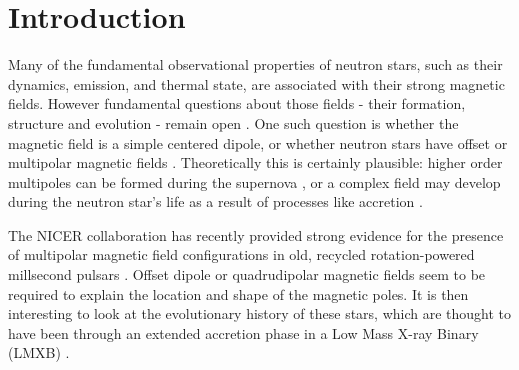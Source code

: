\documentclass[fleqn,usenatbib]{mnras}
\begin{document}
\section{Introduction}

Many of the fundamental observational properties of neutron stars, such as their dynamics, emission, and thermal state, are associated with their strong magnetic fields.  However fundamental questions about those fields - their formation, structure and evolution - remain open \citep[for reviews see][]{Konar2017,Beskin2018,Igoshev2021}.  One such question is whether the magnetic field is a simple centered dipole, or whether neutron stars have offset or multipolar magnetic fields \citep[see e.g.][]{Jones1980,Barnard1982,HardingMuslimov2011fixed,Gralla2017,Sur2020,Petri2021}.  Theoretically this is certainly plausible:  higher order multipoles can be formed during the supernova \citep{Ardeljan2005,Obergaulinger2017}, or a complex field may develop during the neutron star's life as a result of processes like accretion \citep{Suvorov2020}.  

The NICER collaboration has recently provided strong evidence for the presence of multipolar magnetic field configurations in old, recycled rotation-powered millsecond pulsars \citep{Riley2019, Riley2021, Bilous2019, Miller2019, Miller2021}.   Offset dipole or quadrudipolar magnetic fields seem to be required to explain the location and shape of the magnetic poles.  It is then interesting to look at the evolutionary history of these stars, which are thought to have been through an extended accretion phase in a Low Mass X-ray Binary (LMXB) \citep{Alpar1982, Radhakrishnan1982,Bhattacharya1991}.  
\end{document}

